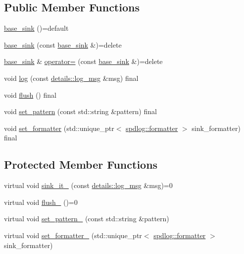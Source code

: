 \subsection*{Public Member Functions}
\begin{DoxyCompactItemize}
\item 
\hyperlink{classspdlog_1_1sinks_1_1base__sink_a38658ba620d110065ce93e178b9ec60e}{base\+\_\+sink} ()=default
\item 
\hyperlink{classspdlog_1_1sinks_1_1base__sink_a9639062f2ce3598203c0d958576491d1}{base\+\_\+sink} (const \hyperlink{classspdlog_1_1sinks_1_1base__sink}{base\+\_\+sink} \&)=delete
\item 
\hyperlink{classspdlog_1_1sinks_1_1base__sink}{base\+\_\+sink} \& \hyperlink{classspdlog_1_1sinks_1_1base__sink_a1b99823aeb2513a891bba168639421a9}{operator=} (const \hyperlink{classspdlog_1_1sinks_1_1base__sink}{base\+\_\+sink} \&)=delete
\item 
void \hyperlink{classspdlog_1_1sinks_1_1base__sink_a6a72602ffe60fdfe6a3cbfbecca54bb0}{log} (const \hyperlink{structspdlog_1_1details_1_1log__msg}{details\+::log\+\_\+msg} \&msg) final
\item 
void \hyperlink{classspdlog_1_1sinks_1_1base__sink_a2de93f1edc37e891555685ed4e520343}{flush} () final
\item 
void \hyperlink{classspdlog_1_1sinks_1_1base__sink_a2b0a0b95f1e7272b443de67b46914152}{set\+\_\+pattern} (const std\+::string \&pattern) final
\item 
void \hyperlink{classspdlog_1_1sinks_1_1base__sink_ad66435c2e9e0adb06ee279dde88a2243}{set\+\_\+formatter} (std\+::unique\+\_\+ptr$<$ \hyperlink{classspdlog_1_1formatter}{spdlog\+::formatter} $>$ sink\+\_\+formatter) final
\end{DoxyCompactItemize}
\subsection*{Protected Member Functions}
\begin{DoxyCompactItemize}
\item 
virtual void \hyperlink{classspdlog_1_1sinks_1_1base__sink_ad698d300cb7f5e58b2aa1b9907cdbd87}{sink\+\_\+it\+\_\+} (const \hyperlink{structspdlog_1_1details_1_1log__msg}{details\+::log\+\_\+msg} \&msg)=0
\item 
virtual void \hyperlink{classspdlog_1_1sinks_1_1base__sink_a5ac2b237c60f68a18122a1ca09b812b4}{flush\+\_\+} ()=0
\item 
virtual void \hyperlink{classspdlog_1_1sinks_1_1base__sink_a56bc5fc8e03dc0aeb6679856ffee7fb4}{set\+\_\+pattern\+\_\+} (const std\+::string \&pattern)
\item 
virtual void \hyperlink{classspdlog_1_1sinks_1_1base__sink_aed93aabfba62b684e603eb525671c864}{set\+\_\+formatter\+\_\+} (std\+::unique\+\_\+ptr$<$ \hyperlink{classspdlog_1_1formatter}{spdlog\+::formatter} $>$ sink\+\_\+formatter)
\end{DoxyCompactItemize}
